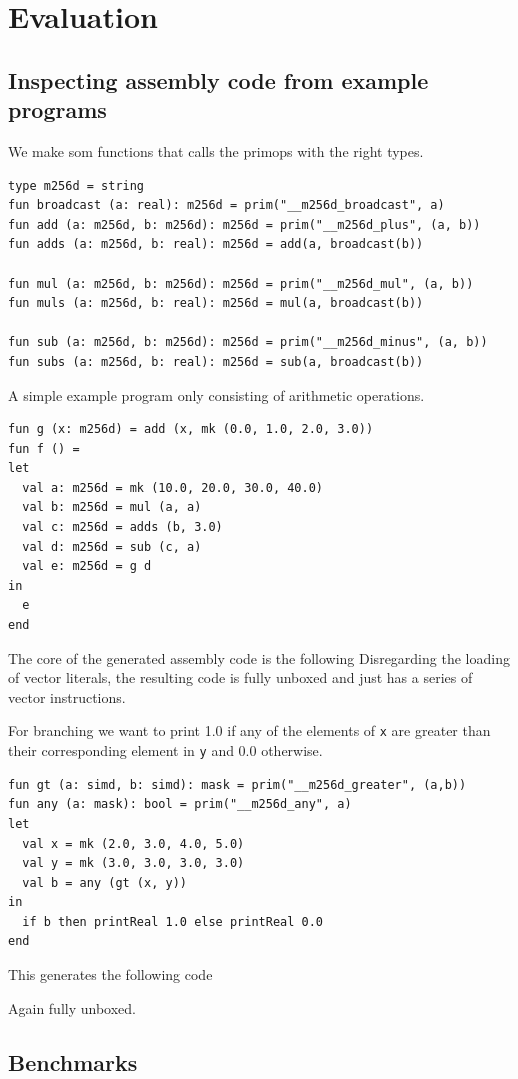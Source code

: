 \documentclass{article}
\begin{document}
\section{Evaluation}

\subsection{Inspecting assembly code from example programs}

We make som functions that calls the primops with the right types.
\begin{lstlisting}
type m256d = string
fun broadcast (a: real): m256d = prim("__m256d_broadcast", a)
fun add (a: m256d, b: m256d): m256d = prim("__m256d_plus", (a, b))
fun adds (a: m256d, b: real): m256d = add(a, broadcast(b))

fun mul (a: m256d, b: m256d): m256d = prim("__m256d_mul", (a, b))
fun muls (a: m256d, b: real): m256d = mul(a, broadcast(b))

fun sub (a: m256d, b: m256d): m256d = prim("__m256d_minus", (a, b))
fun subs (a: m256d, b: real): m256d = sub(a, broadcast(b))
\end{lstlisting}
A simple example program only consisting of arithmetic operations.
\begin{lstlisting}
fun g (x: m256d) = add (x, mk (0.0, 1.0, 2.0, 3.0))
fun f () =
let
  val a: m256d = mk (10.0, 20.0, 30.0, 40.0)
  val b: m256d = mul (a, a)
  val c: m256d = adds (b, 3.0)
  val d: m256d = sub (c, a)
  val e: m256d = g d
in 
  e
end
\end{lstlisting}
The core of the generated assembly code is the following
Disregarding the loading of vector literals, the resulting code is fully unboxed and just has a series of vector instructions.

For branching we want to print 1.0 if any of the elements of \verb!x! are greater than their corresponding element in \verb!y! and 0.0 otherwise.

\begin{lstlisting}
fun gt (a: simd, b: simd): mask = prim("__m256d_greater", (a,b))
fun any (a: mask): bool = prim("__m256d_any", a)
let
  val x = mk (2.0, 3.0, 4.0, 5.0)
  val y = mk (3.0, 3.0, 3.0, 3.0)
  val b = any (gt (x, y))
in 
  if b then printReal 1.0 else printReal 0.0
end
\end{lstlisting}

This generates the following code

Again fully unboxed.

\subsection{Benchmarks}
\end{document}
